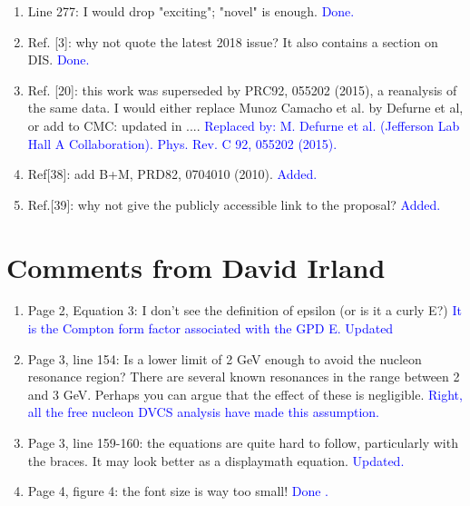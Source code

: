 \documentclass[a4paper,11pt,twoside]{article}
\begin{document}
\begin{enumerate}
   \item Line 277: I would drop "exciting"; "novel" is enough.
\textcolor{blue}{Done.}

   \item Ref. [3]: why not quote the latest 2018 issue? It also contains a 
      section on DIS.
\textcolor{blue}{Done.}

   \item Ref. [20]: this work was superseded by PRC92, 055202 (2015), a 
      reanalysis of the same data. I would either replace Munoz Camacho et al.  
      by Defurne et al, or add to CMC: updated in ....
      \textcolor{blue}{Replaced by: M. Defurne et al. (Jefferson Lab Hall A 
      Collaboration). Phys. Rev. C 92, 055202 (2015).}

   \item Ref[38]: add B+M, PRD82, 0704010 (2010).
\textcolor{blue}{Added.}

   \item Ref.[39]: why not give the publicly accessible link to the proposal?
   \textcolor{blue}{Added.}
  
\end{enumerate}



\section{Comments from David Irland}


\begin{enumerate}

\item Page 2, Equation 3: I don't see the definition of epsilon (or is it a 
   curly E?)
\textcolor{blue}{It is the Compton form factor associated with the GPD E.  
      Updated}

\item Page 3, line 154: Is a lower limit of 2 GeV enough to avoid the nucleon 
   resonance region? There are several known resonances in the range between 2 
      and 3 GeV. Perhaps you can argue that the effect of these is negligible.
\textcolor{blue}{Right, all the free nucleon DVCS analysis have made this 
      assumption.}

\item Page 3, line 159-160: the equations are quite hard to follow, 
   particularly with the braces. It may look better as a displaymath equation.
\textcolor{blue}{Updated.}

\item Page 4, figure 4: the font size is way too small!  \textcolor{blue}{Done
   .}
  
\end{enumerate}
\end{document}
